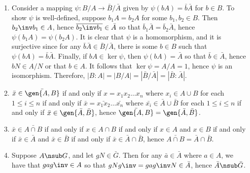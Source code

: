 \begin{problems}
\begin{sol}
\begin{enumerate}
            \noindent \leftimp Suppose $\bar A \leq \bar B$ for $A, B \in \ac$, and suppose $a \in A$ for some $a \in A$. Then $\bar a \in \bar A$ so that $\bar a \in \bar B$, hence there is some $b \in B$ such that $\bar a = \bar b$. It follows that $aN = bN$ so that $b\inv a \in N \subseteq B$, hence $a = b(b\inv a) \in B$. Therefore, $A \leq B$.
            \item Consider a mapping $\psi : B/A \to \bar B / \bar A$ given by $\psi(bA) = \bar b \bar A$ for $b \in B$. To show $\psi$ is well-defined, suppose $b_1A = b_2A$ for some $b_1, b_2 \in B$. Then $b_2\inv b_1 \in A$, hence $\overline{b_2\inv b_1} \in \bar A$ so that $\bar b_1 \bar A = \bar b_2 \bar A$, hence $\psi(b_1A) = \psi(b_2A)$. It is clear that $\psi$ is a homomorphism, and it is surjective since for any $\bar b \bar A \in \bar B / \bar A$, there is some $b \in B$ such that $\psi(bA) = \bar b \bar A$. Finally, if $bA \in \ker\psi$, then $\psi(bA) = \bar A$ so that $\bar b \in \bar A$, hence $bN \in A/N$ or that $b \in A$. It follows that $\ker\psi = A/A = 1$, hence $\psi$ is an isomorphism. Therefore, $|B : A| = |B/A| = |\bar B / \bar A| = |\bar B : \bar A|$.
            \item $\bar x \in \bar{\gen{A, B}}$ if and only if $x = x_1x_2 \ldots x_n$ where $x_i \in A \cup B$ for each $1 \leq i \leq n$ if and only if $\bar x = \bar{x_1x_2} \ldots \bar{x_n}$ where $\bar{x_i} \in \bar A \cup \bar B$ for each $1 \leq i \leq n$ if and only if $\bar x \in \gen{\bar A, \bar B}$, hence $\bar{\gen{A, B}} = \gen{\bar A, \bar B}$.
            \item $\bar x \in \bar{A \cap B}$ if and only if $x \in A \cap B$ if and only if $x \in A$ and $x \in B$ if and only if $\bar x \in \bar A$ and $\bar x \in \bar B$ if and only if $\bar x \in \bar A \cap \bar B$, hence $\bar{A \cap B} = \bar A \cap \bar B$.
            \item \rightimp Suppose $A \nsub G$, and let $gN \in \bar G$. Then for any $\bar a \in \bar A$ where $a \in A$, we have that $gag\inv \in A$ so that $gNg\inv = gag\inv N \in \bar A$, hence $\bar A \nsub \bar G$.
            

\end{enumerate}
\end{sol}
\end{problems}
